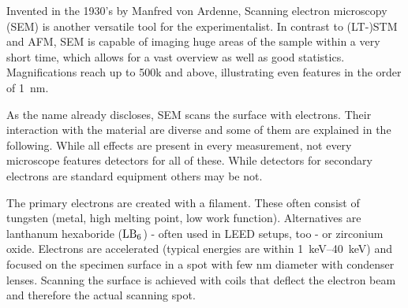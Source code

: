 Invented in the 1930's by Manfred von Ardenne\cite{ardenne_elektronen-rastermikroskop_1938}, Scanning electron microscopy (SEM) is another versatile tool for the experimentalist. In contrast to (LT-)STM and AFM, SEM is capable of imaging huge areas of the sample within a very short time, which allows for a vast overview as well as good statistics. Magnifications reach up to 500k and above, illustrating even features in the order of \SI{1}{\nano \meter}.

As the name already discloses, SEM scans the surface with electrons. Their interaction with the material are diverse and some of them are explained in the following. While all effects are present in every measurement, not every microscope features detectors for all of these. While detectors for secondary electrons are standard equipment others may be not.


The primary electrons are created with a filament. These often consist of tungsten (metal, high melting point, low work function). Alternatives are lanthanum hexaboride ($\textnormal{LB}_6$) - often used in LEED setups, too - or zirconium oxide.
Electrons are accelerated (typical energies are within \SIrange{1}{40}{\kilo \eV}) and focused on the specimen surface in a spot with few \si{nm} diameter with condenser lenses. Scanning the surface is achieved with coils that deflect the electron beam and therefore the actual scanning spot.

